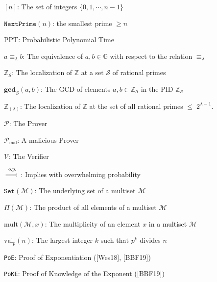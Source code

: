 \documentclass[11pt, lettersize, notitlepage, leqno, footskip=0.6cm]{article}
\newcommand{\bz}{\mathbb Z}
\newcommand{\ttt}{\texttt}
\newcommand{\sett}{\ttt{Set}}
\newcommand{\impop}{\overset{\;\;\mr{o.p.}\;\;}{\Longrightarrow}}
\newcommand{\eqlam}{\equiv_{\lam}}
\newcommand{\mc}{\mathcal}
\newcommand{\mb}{\mathbb}
\newcommand{\mbf}{\mathbf}
\newcommand{\mr}{\mathrm}
\newcommand{\lam}{\lambda}
\newcommand{\noin}{\noindent}
\newcommand{\GCD}{\mbf{gcd}}
\numberwithin{equation}{section}
\begin{document}
{\noindent $[n]$: The set of integers $\{0,1,\cdots,n-1 \}$ \vspace{0.1cm}

\noin $\ttt{NextPrime}(n)$: the smallest prime $\geq n$ \vspace{0.1cm}

\noin PPT: Probabilistic Polynomial Time \vspace{0.1cm}

\noindent $a\eqlam b$: The equivalence of $a,b\in\mb{G}$ with respect to the relation $\eqlam$ \vspace{0.1cm}

\noin $\bz_{\mc{S}}$: The localization of $\bz$ at a set $\mc{S}$ of rational primes \vspace{0.1cm}

\noin $\GCD_S(a, b)$: The GCD of elements $a,b\in \bz_{\mc{S}}$ in the PID $\bz_{\mc{S}}$ \vspace{0.1cm}

\noin $\bz_{(\lam)}$: The localization of $\bz$ at the set of all rational primes $\leq\; 2^{\lam-1}$. \vspace{0.1cm}

\noin $\mc{P}$: The Prover \vspace{0.1cm}

\noin $\mc{P}_{\mr{mal}}$: A malicious Prover \vspace{0.1cm}

\noin $\mc{V}$: The Verifier \vspace{0.1cm}

\noin $\impop$: Implies with overwhelming probability \vspace{0.1cm}

\noin $\sett(\mc{M})$: The underlying set of a multiset $\mc{M}$ \vspace{0.1cm}

\noin $\Pi(\mc{M})$: The product of all elements of a multiset $\mc{M}$ \vspace{0.1cm}

\noin $\mr{mult}(\mc{M},x)$: The multiplicity of an element $x$ in a multiset $\mc{M}$ \vspace{0.1cm}

\noin $\mr{val}_p(n)$: The largest integer $k$ such that $p^k$ divides $n$ \vspace{0.1cm}

\noin \verb|PoE|: Proof of Exponentiation ([Wes18], [BBF19])

\noin \verb|PoKE|: Proof of Knowledge of the Exponent ([BBF19])

}
\end{document}
